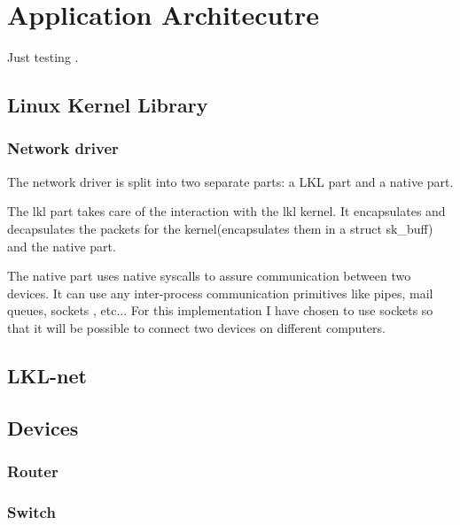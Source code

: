 \chapter{Application Architecutre}
\label{chapter:arch}

Just testing \cite{linnetarch}.

\section{Linux Kernel Library}
\label{sec:lkl}

\subsection{Network driver}
\label{sec:net-driver}

The network driver is split into two separate parts: a LKL part and a native part.

The lkl part takes care of the interaction with the lkl kernel. It encapsulates
and decapsulates the packets for the kernel(encapsulates them in a struct sk_buff)
and the native part.

The native part uses native syscalls to assure communication between two devices.
It can use any inter-process communication primitives like pipes, mail queues, sockets
, etc... For this implementation I have chosen to use sockets so that it will be possible
to connect two devices on different computers.


\section{LKL-net}
\label{sec:lkl-net}


\section{Devices}
\label{sec:devices}

\subsection{Router}
\label{sub-sec:router}

\subsection{Switch}
\label{sub-sec:switch}

